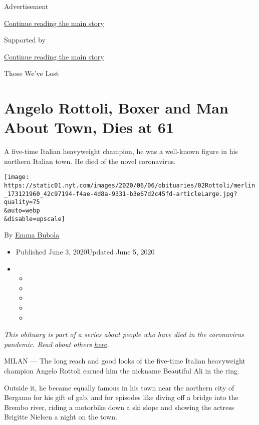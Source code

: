 Advertisement

\protect\hyperlink{after-top}{Continue reading the main story}

Supported by

\protect\hyperlink{after-sponsor}{Continue reading the main story}

Those We've Lost

\hypertarget{angelo-rottoli-boxer-and-man-about-town-dies-at-61}{%
\section{Angelo Rottoli, Boxer and Man About Town, Dies at
61}\label{angelo-rottoli-boxer-and-man-about-town-dies-at-61}}

A five-time Italian heavyweight champion, he was a well-known figure in
his northern Italian town. He died of the novel coronavirus.

\texttt{[image: https://static01.nyt.com/images/2020/06/06/obituaries/02Rottoli/merlin\_173121960\_42c97194-f4ae-4d8a-9331-b3e67d2c45fd-articleLarge.jpg?quality=75\\\&auto=webp\\\&disable=upscale]}

By \href{https://www.nytimes.com/by/emma-bubola}{Emma Bubola}

\begin{itemize}
\item
  Published June 3, 2020Updated June 5, 2020
\item
  \begin{itemize}
  \item
  \item
  \item
  \item
  \item
  \end{itemize}
\end{itemize}

\emph{This obituary is part of a series about people who have died in
the coronavirus pandemic. Read about others}
\href{https://www.nytimes.com/interactive/2020/obituaries/people-died-coronavirus-obituaries.html}{\emph{here}}\emph{.}

MILAN --- The long reach and good looks of the five-time Italian
heavyweight champion Angelo Rottoli earned him the nickname Beautiful
Ali in the ring.

Outside it, he became equally famous in his town near the northern city
of Bergamo for his gift of gab, and for episodes like diving off a
bridge into the Brembo river, riding a motorbike down a ski slope and
showing the actress Brigitte Nielsen a night on the town.

